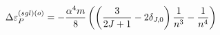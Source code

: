 \begin{equation}
\Delta \varepsilon _{P}^{(sgl)\left( o\right) }=-\frac{\alpha ^{4}m}{8}%
\left( \left( \frac{3}{2J+1}-2\delta _{J,0}\right) \frac{1}{n^{3}}-\frac{1}{%
n^{4}}\right)
\end{equation}

